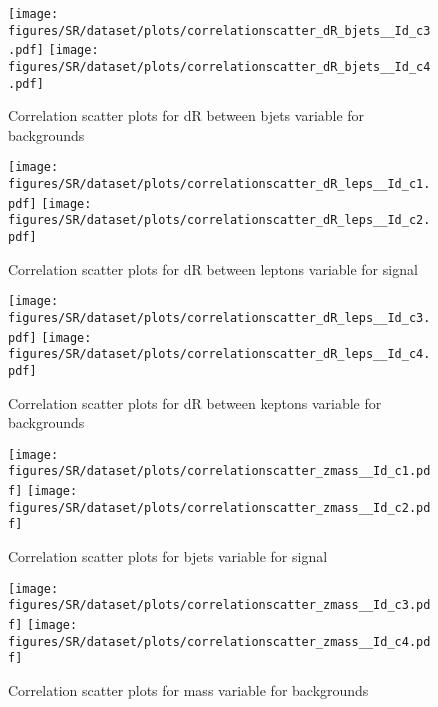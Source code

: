 \begin{figure}[!htb]%
\centering
\texttt{[image: figures/SR/dataset/plots/correlationscatter\_dR\_bjets\_\_Id\_c3.pdf]}
\texttt{[image: figures/SR/dataset/plots/correlationscatter\_dR\_bjets\_\_Id\_c4.pdf]}
\caption{ Correlation scatter plots for dR between bjets variable for backgrounds}%
\label{fig:correlations_SR_drbjets_BG}                                                       
\end{figure}
\clearpage


\begin{figure}[!htb]%
\centering
\texttt{[image: figures/SR/dataset/plots/correlationscatter\_dR\_leps\_\_Id\_c1.pdf]}
\texttt{[image: figures/SR/dataset/plots/correlationscatter\_dR\_leps\_\_Id\_c2.pdf]}
\caption{ Correlation scatter plots for dR between leptons variable for signal}%
\label{fig:correlations_SR_drleps_S}                                                       
\end{figure}
\clearpage


\begin{figure}[!htb]%
\centering
\texttt{[image: figures/SR/dataset/plots/correlationscatter\_dR\_leps\_\_Id\_c3.pdf]}
\texttt{[image: figures/SR/dataset/plots/correlationscatter\_dR\_leps\_\_Id\_c4.pdf]}
\caption{ Correlation scatter plots for dR between keptons variable for backgrounds}%
\label{fig:correlations_SR_drleps_BG}                                                       
\end{figure}
\clearpage


\begin{figure}[!htb]%
\centering
\texttt{[image: figures/SR/dataset/plots/correlationscatter\_zmass\_\_Id\_c1.pdf]}
\texttt{[image: figures/SR/dataset/plots/correlationscatter\_zmass\_\_Id\_c2.pdf]}
\caption{ Correlation scatter plots for \Zll bjets variable for signal}%
\label{fig:correlations_SR_zmass_S}                                                       
\end{figure}
\clearpage


\begin{figure}[!htb]%
\centering
\texttt{[image: figures/SR/dataset/plots/correlationscatter\_zmass\_\_Id\_c3.pdf]}
\texttt{[image: figures/SR/dataset/plots/correlationscatter\_zmass\_\_Id\_c4.pdf]}
\caption{ Correlation scatter plots for \Zll mass variable for backgrounds}%
\label{fig:correlations_SR_zmass_BG}                                                       
\end{figure}
\clearpage


